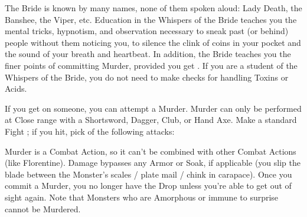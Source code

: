 {    The Bride is known by many names, none of them spoken aloud:  Lady Death, the Banshee, the Viper, etc.  Education in the Whispers of the Bride teaches you the mental tricks, hypnotism, and observation necessary to sneak past (or behind) people without them noticing you, to silence the clink of coins in your pocket and the sound of your breath and heartbeat. In addition, the Bride teaches you the finer points of committing Murder, provided you get  . If you are a student of the Whispers of the Bride, you do not need to make \DEX checks for handling Toxins or Acids.

    \cbreak


    If you get  on someone, you can attempt a Murder.  Murder can only be performed at Close range with a Shortsword, Dagger, Club, or Hand Axe.  Make a standard Fight \RO; if you hit, pick  of the following attacks:


   Murder is a Combat Action, so it can't be combined with other Combat Actions (like Florentine). Damage bypasses any Armor or Soak, if applicable (you slip the blade between the Monster's scales / plate mail / chink in carapace). Once you commit a Murder, you no longer have the Drop unless you're able to get out of sight again. Note that Monsters who are Amorphous or immune to surprise cannot be Murdered. 

  \newpage


  }
